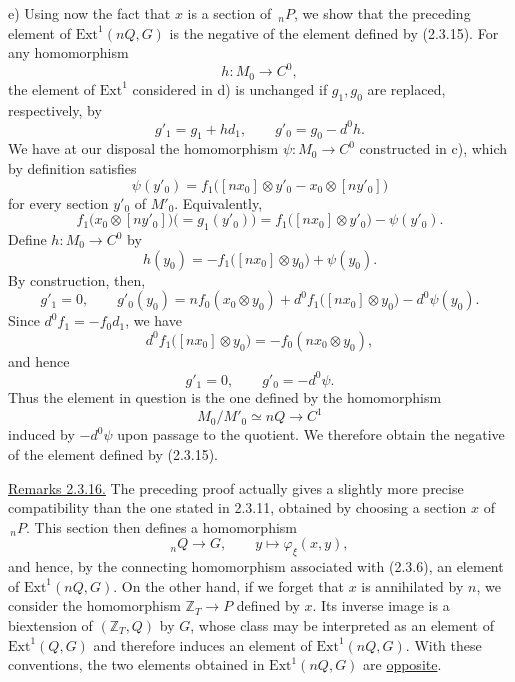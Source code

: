 \medskip
\noindent e) Using now the fact that $x$ is a section of $\,{}_nP$,
we show that the preceding element of $\mathrm{Ext}^1(nQ,G)$ is the
negative of the element defined by (2.3.15).  For any homomorphism
\[
 h:M_0\longrightarrow C^0,
\]
the element of $\mathrm{Ext}^1$ considered in d) is unchanged if
$g_1,g_0$ are replaced, respectively, by
\[
 g'_1=g_1+h d_1,
 \qquad
 g'_0=g_0-d^0h.
\]
We have at our disposal the homomorphism
$\psi:M_0\longrightarrow C^0$ constructed in c), which by definition
satisfies
\[
 \psi(y'_0)=
 f_1\bigl([nx_0]\otimes y'_0-x_0\otimes[ny'_0]\bigr)
\]
for every section $y'_0$ of $M'_0$.  Equivalently,
\[
 f_1\bigl(x_0\otimes[ny'_0]\bigr)
 \bigl(=g_1(y'_0)\bigr)
 =f_1\bigl([nx_0]\otimes y'_0\bigr)-\psi(y'_0).
\]
Define $h:M_0\longrightarrow C^0$ by
\[
 h(y_0)=-f_1\bigl([nx_0]\otimes y_0\bigr)+\psi(y_0).
\]
By construction, then,
\[
 g'_1=0,
 \qquad
 g'_0(y_0)=n f_0(x_0\otimes y_0)
 +d^0f_1\bigl([nx_0]\otimes y_0\bigr)-d^0\psi(y_0).
\]
Since $d^0f_1=-f_0d_1$, we have
\[
 d^0f_1\bigl([nx_0]\otimes y_0\bigr)
 =-f_0(nx_0\otimes y_0),
\]
and hence
\[
 g'_1=0,
 \qquad
 g'_0=-d^0\psi.
\]
Thus the element in question is the one defined by the homomorphism
\[
 M_0/M'_0\simeq nQ\longrightarrow C^1
\]
induced by $-d^0\psi$ upon passage to the quotient.  We therefore
obtain the negative of the element defined by (2.3.15).

\medskip
\noindent\underline{Remarks 2.3.16.}  The preceding proof actually
gives a slightly more precise compatibility than the one stated in
2.3.11, obtained by choosing a section $x$ of $\,{}_nP$.  This section
then defines a homomorphism
\[
 {}_nQ\longrightarrow G,
 \qquad
 y\longmapsto\varphi_\xi(x,y),
\]
and hence, by the connecting homomorphism associated with (2.3.6), an
element of $\mathrm{Ext}^1(nQ,G)$.  On the other hand, if we forget
that $x$ is annihilated by $n$, we consider the homomorphism
$\mathbb Z_T\longrightarrow P$ defined by $x$.  Its inverse image is a
biextension of $(\mathbb Z_T,Q)$ by $G$, whose class may be interpreted
as an element of $\mathrm{Ext}^1(Q,G)$ and therefore induces an element
of $\mathrm{Ext}^1(nQ,G)$.  With these conventions, the two elements
obtained in $\mathrm{Ext}^1(nQ,G)$ are \underline{opposite}.
